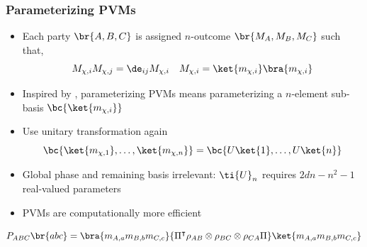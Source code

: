 \documentclass[
    hyperref={colorlinks=true, linkcolor=blue, urlcolor=blue, citecolor=MidnightBlue},
    xcolor={dvipsnames},
]{beamer}
\begin{document}
\begin{frame}
    \frametitle{Parameterizing PVMs}
    \begin{itemize}
        \item Each party $\br{A, B, C}$ is assigned $n$-outcome $\br{M_A, M_B, M_C}$ such that,
        \[ M_{\chi,i}M_{\chi,j} = \de_{ij} M_{\chi, i} \quad M_{\chi, i} = \ket{m_{\chi,i}}\bra{m_{\chi,i}} \]
        \item Inspired by \cite{Pal_2010}, parameterizing PVMs means parameterizing a $n$-element sub-basis $\bc{\ket{m_{\chi,i}}}$
        \item Use unitary transformation again
        \[ \bc{\ket{m_{\chi,1}}, \ldots, \ket{m_{\chi,n}}} = \bc{U \ket{1}, \ldots, U \ket{n}} \]
        \item Global phase and remaining basis irrelevant: $\ti{U}_{n}$ requires $2dn -n^2 -1$ real-valued parameters\
        \item PVMs are computationally more efficient
    \end{itemize}
    \[ \prob[ABC]\br{abc} = \bra{m_{A,a}m_{B,b}m_{C,c}}{\netperm^\intercal \rho_{AB}\otimes\rho_{BC}\otimes\rho_{CA} \netperm}\ket{m_{A,a}m_{B,b}m_{C,c}} \]
\end{frame}
\end{document}
